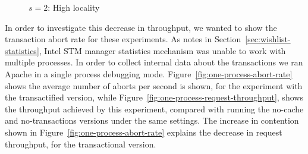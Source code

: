 \documentclass[preprint,11pt]{sigplanconf}
\begin{document}
\begin{figure}
 \centering
 \hfill
 \caption{$s = 2$: High locality}
\end{figure}

In order to investigate this decrease in throughput, we wanted to show the
transaction abort rate for these experiments. As notes in
Section~\ref{sec:wishlist-statistics}, Intel STM manager statistics mechanism
was unable to work with multiple processes. In order to collect
internal data about the transactions we ran Apache in a single process debugging
mode. Figure~\ref{fig:one-process-abort-rate} shows the average number of aborts
per second is shown, for the experiment with the transactified version, while
Figure~\ref{fig:one-process-request-throughput}, shows the throughput achieved by
this experiment, compared with running the no-cache and no-transactions versions
under the same settings. The increase in contention shown in
Figure~\ref{fig:one-process-abort-rate} explains the decrease in request
throughput, for the transactional version.
\end{document}
